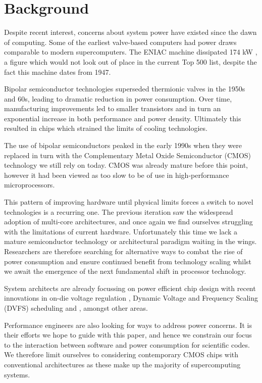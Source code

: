 \section{Background}
\label{sec:background}
Despite recent interest, concerns about system power have existed since the dawn of computing. Some of the earliest valve-based computers had power draws comparable to modern supercomputers. The ENIAC machine dissipated 174 kW \cite{birnbaum:2000aa}, a figure which would not look out of place in the current Top 500 list, despite the fact this machine dates from 1947.\golden

Bipolar semiconductor technologies superseded thermionic valves in the 1950s and 60s, leading to dramatic reduction in power consumption. Over time, manufacturing improvements led to smaller transistors and in turn an exponential increase in both performance and power density. Ultimately this resulted in chips which strained the limits of cooling technologies. \golden

The use of bipolar semiconductors peaked in the early 1990s when they were replaced in turn with the Complementary Metal Oxide Semiconductor (CMOS) technology we still rely on today. CMOS was already mature before this point, however it had been viewed as too slow to be of use in high-performance microprocessors. \golden


This pattern of improving hardware until physical limits forces a switch to novel technologies is a recurring one. The previous iteration saw the widespread adoption of multi-core architectures, and once again we find ourselves struggling with the limitations of current hardware. Unfortunately this time we lack a mature semiconductor technology or architectural paradigm waiting in the wings. Researchers are therefore searching for alternative ways to combat the rise of power consumption and ensure continued benefit from technology scaling whilst we await the emergence of the next fundamental shift in processor technology. \golden

System architects are already focussing on power efficient chip design with recent innovations in on-die voltage regulation \cite{burton:2014aa}, Dynamic Voltage and Frequency Scaling (DVFS) scheduling \cite{kwon:2013aa} and , amongst other areas.

Performance engineers are also looking for ways to address power concerns. It is their efforts we hope to guide with this paper, and hence we constrain our focus to the interaction between software and power consumption for scientific codes. We therefore limit ourselves to considering contemporary CMOS chips with conventional architectures as these make up the majority of supercomputing systems.


